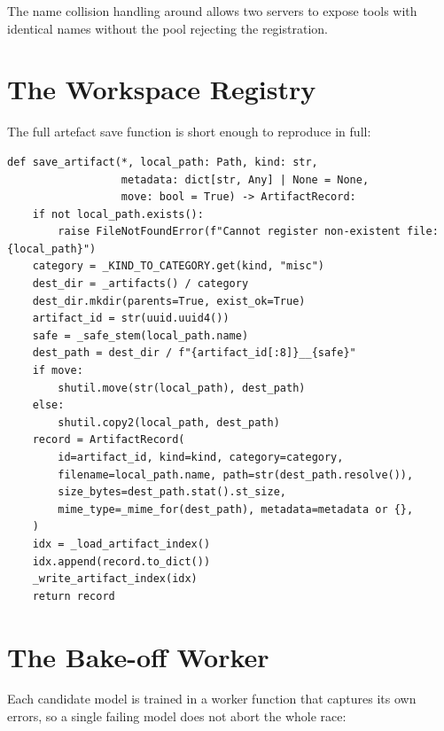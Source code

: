 The name collision handling around  allows two servers
to expose tools with identical names without the pool rejecting the
registration.

\section{The Workspace Registry}
\label{sec:workspace-impl}

The full artefact save function is short enough to reproduce in
full:

\begin{lstlisting}[caption={\code{core/workspace.py::save\_artifact}
(complete function).}, label={lst:save-art}]
def save_artifact(*, local_path: Path, kind: str,
                  metadata: dict[str, Any] | None = None,
                  move: bool = True) -> ArtifactRecord:
    if not local_path.exists():
        raise FileNotFoundError(f"Cannot register non-existent file: {local_path}")
    category = _KIND_TO_CATEGORY.get(kind, "misc")
    dest_dir = _artifacts() / category
    dest_dir.mkdir(parents=True, exist_ok=True)
    artifact_id = str(uuid.uuid4())
    safe = _safe_stem(local_path.name)
    dest_path = dest_dir / f"{artifact_id[:8]}__{safe}"
    if move:
        shutil.move(str(local_path), dest_path)
    else:
        shutil.copy2(local_path, dest_path)
    record = ArtifactRecord(
        id=artifact_id, kind=kind, category=category,
        filename=local_path.name, path=str(dest_path.resolve()),
        size_bytes=dest_path.stat().st_size,
        mime_type=_mime_for(dest_path), metadata=metadata or {},
    )
    idx = _load_artifact_index()
    idx.append(record.to_dict())
    _write_artifact_index(idx)
    return record
\end{lstlisting}

\section{The Bake-off Worker}
\label{sec:worker-impl}

Each candidate model is trained in a worker function that captures
its own errors, so a single failing model does not abort the whole
race:

